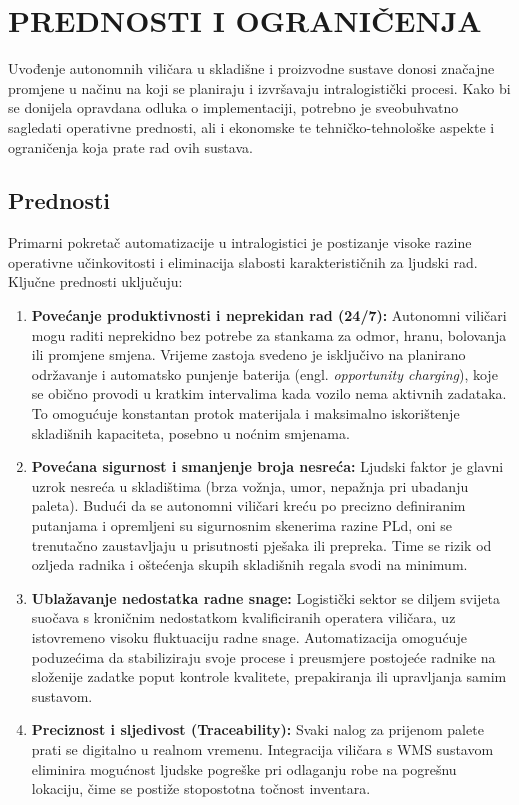 \section{PREDNOSTI I OGRANIČENJA}
Uvođenje autonomnih viličara u skladišne i proizvodne sustave donosi značajne promjene u načinu na koji se planiraju i izvršavaju intralogistički procesi. Kako bi se donijela opravdana odluka o implementaciji, potrebno je sveobuhvatno sagledati operativne prednosti, ali i ekonomske te tehničko-tehnološke aspekte i ograničenja koja prate rad ovih sustava.

\subsection{Prednosti}
Primarni pokretač automatizacije u intralogistici je postizanje visoke razine operativne učinkovitosti i eliminacija slabosti karakterističnih za ljudski rad. Ključne prednosti uključuju:
\begin{enumerate}
    \item \textbf{Povećanje produktivnosti i neprekidan rad (24/7):} Autonomni viličari mogu raditi neprekidno bez potrebe za stankama za odmor, hranu, bolovanja ili promjene smjena. Vrijeme zastoja svedeno je isključivo na planirano održavanje i automatsko punjenje baterija (engl. \textit{opportunity charging}), koje se obično provodi u kratkim intervalima kada vozilo nema aktivnih zadataka. To omogućuje konstantan protok materijala i maksimalno iskorištenje skladišnih kapaciteta, posebno u noćnim smjenama.
    \item \textbf{Povećana sigurnost i smanjenje broja nesreća:} Ljudski faktor je glavni uzrok nesreća u skladištima (brza vožnja, umor, nepažnja pri ubadanju paleta). Budući da se autonomni viličari kreću po precizno definiranim putanjama i opremljeni su sigurnosnim skenerima razine PLd, oni se trenutačno zaustavljaju u prisutnosti pješaka ili prepreka. Time se rizik od ozljeda radnika i oštećenja skupih skladišnih regala svodi na minimum.
    \item \textbf{Ublažavanje nedostatka radne snage:} Logistički sektor se diljem svijeta suočava s kroničnim nedostatkom kvalificiranih operatera viličara, uz istovremeno visoku fluktuaciju radne snage. Automatizacija omogućuje poduzećima da stabiliziraju svoje procese i preusmjere postojeće radnike na složenije zadatke poput kontrole kvalitete, prepakiranja ili upravljanja samim sustavom.
    \item \textbf{Preciznost i sljedivost (Traceability):} Svaki nalog za prijenom palete prati se digitalno u realnom vremenu. Integracija viličara s WMS sustavom eliminira mogućnost ljudske pogreške pri odlaganju robe na pogrešnu lokaciju, čime se postiže stopostotna točnost inventara.
\end{enumerate}

